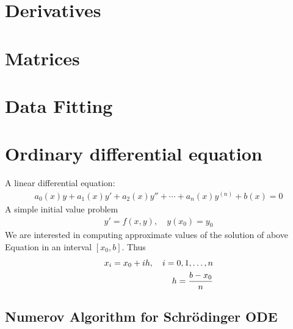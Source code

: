 \documentclass[letterpaper,10pt,english]{sphinxmanual}
\begin{document}
\chapter{Derivatives}
\label{\detokenize{Derivatives/Derivatives:derivatives}}\label{\detokenize{Derivatives/Derivatives::doc}}
\sphinxstepscope


\chapter{Matrices}
\label{\detokenize{Matrices/Matrices:matrices}}\label{\detokenize{Matrices/Matrices::doc}}
\sphinxstepscope


\chapter{Data Fitting}
\label{\detokenize{DataFitting/DataFitting:data-fitting}}\label{\detokenize{DataFitting/DataFitting::doc}}
\sphinxstepscope


\chapter{Ordinary differential equation}
\label{\detokenize{ODE/ODE:ordinary-differential-equation}}\label{\detokenize{ODE/ODE::doc}}
\sphinxAtStartPar
A linear differential equation:
\begin{equation*}
\begin{split}a_{0}(x)y+a_{1}(x)y'+a_{2}(x)y''+\cdots +a_{n}(x)y^{(n)}+b(x)=0\end{split}
\end{equation*}
\sphinxAtStartPar
A simple initial value problem
\begin{equation*}
\begin{split}y'=f(x,y),\quad y(x_0)=y_0\end{split}
\end{equation*}
\sphinxAtStartPar
We are interested in computing approximate values of the solution of above Equation in an interval \([x_0,b]\). Thus
\begin{equation*}
\begin{split}x_i=x_0+ih,\quad i=0,1, \dots,n \\
h={b-x_0\over n}\end{split}
\end{equation*}

\section{Numerov Algorithm for Schrödinger ODE}
\label{\detokenize{ODE/ODE:numerov-algorithm-for-schrodinger-ode}}
\sphinxstepscope
\end{document}

